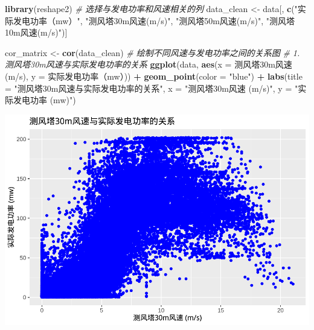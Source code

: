 \documentclass[
]{ctexart}
\newenvironment{Shaded}{\begin{snugshade}}{\end{snugshade}}
\newcommand{\AttributeTok}[1]{\textcolor[rgb]{0.13,0.29,0.53}{#1}}
\newcommand{\CommentTok}[1]{\textcolor[rgb]{0.56,0.35,0.01}{\textit{#1}}}
\newcommand{\FunctionTok}[1]{\textcolor[rgb]{0.13,0.29,0.53}{\textbf{#1}}}
\newcommand{\NormalTok}[1]{#1}
\newcommand{\OtherTok}[1]{\textcolor[rgb]{0.56,0.35,0.01}{#1}}
\newcommand{\SpecialCharTok}[1]{\textcolor[rgb]{0.81,0.36,0.00}{\textbf{#1}}}
\newcommand{\StringTok}[1]{\textcolor[rgb]{0.31,0.60,0.02}{#1}}
\begin{document}
\begin{Shaded}
\begin{Highlighting}[]
\FunctionTok{library}\NormalTok{(reshape2)}
\CommentTok{\# 选择与发电功率和风速相关的列}
\NormalTok{data\_clean }\OtherTok{\textless{}{-}}\NormalTok{ data[, }\FunctionTok{c}\NormalTok{(}\StringTok{"实际发电功率（mw）"}\NormalTok{, }\StringTok{"测风塔30m风速(m/s)"}\NormalTok{, }\StringTok{"测风塔50m风速(m/s)"}\NormalTok{, }\StringTok{"测风塔10m风速(m/s)"}\NormalTok{)]}

\NormalTok{cor\_matrix }\OtherTok{\textless{}{-}} \FunctionTok{cor}\NormalTok{(data\_clean)}
\CommentTok{\# 绘制不同风速与发电功率之间的关系图}
\CommentTok{\# 1. 测风塔30m风速与实际发电功率的关系}
\FunctionTok{ggplot}\NormalTok{(data, }\FunctionTok{aes}\NormalTok{(}\AttributeTok{x =} \StringTok{\textasciigrave{}}\AttributeTok{测风塔30m风速(m/s)}\StringTok{\textasciigrave{}}\NormalTok{, }\AttributeTok{y =} \StringTok{\textasciigrave{}}\AttributeTok{实际发电功率（mw）}\StringTok{\textasciigrave{}}\NormalTok{)) }\SpecialCharTok{+}
  \FunctionTok{geom\_point}\NormalTok{(}\AttributeTok{color =} \StringTok{"blue"}\NormalTok{) }\SpecialCharTok{+}
  \FunctionTok{labs}\NormalTok{(}\AttributeTok{title =} \StringTok{"测风塔30m风速与实际发电功率的关系"}\NormalTok{,}
       \AttributeTok{x =} \StringTok{"测风塔30m风速 (m/s)"}\NormalTok{,}
       \AttributeTok{y =} \StringTok{"实际发电功率 (mw)"}\NormalTok{)}
\end{Highlighting}
\end{Shaded}

\includegraphics{1_files/figure-latex/unnamed-chunk-6-1.pdf}
\end{document}
